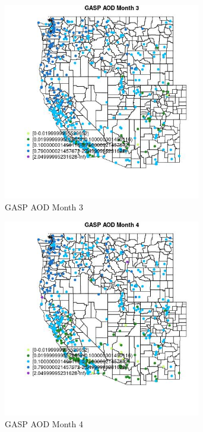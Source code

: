 \begin{figure} 
\centering  
\includegraphics[width=0.77\textwidth]{Code_Outputs/Report_ML_input_PM25_Step4_part_e_de_duplicated_aves_compiled_2019-05-14wNAs_MapObsMo3GASP_AOD.jpg} 
\caption{\label{fig:Report_ML_input_PM25_Step4_part_e_de_duplicated_aves_compiled_2019-05-14wNAsMapObsMo3GASP_AOD}GASP AOD Month 3} 
\end{figure} 
 

\begin{figure} 
\centering  
\includegraphics[width=0.77\textwidth]{Code_Outputs/Report_ML_input_PM25_Step4_part_e_de_duplicated_aves_compiled_2019-05-14wNAs_MapObsMo4GASP_AOD.jpg} 
\caption{\label{fig:Report_ML_input_PM25_Step4_part_e_de_duplicated_aves_compiled_2019-05-14wNAsMapObsMo4GASP_AOD}GASP AOD Month 4} 
\end{figure} 
 

